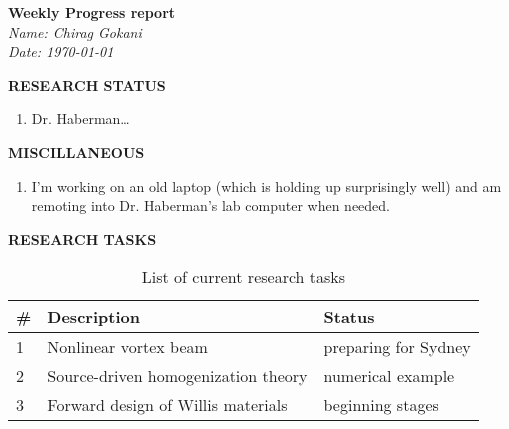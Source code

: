\documentclass[12pt]{article}
\begin{document}
\noindent\textbf{Weekly Progress report}\\
\textit{Name: Chirag Gokani\\Date: \today}\\
\vspace{12pt}


\noindent \textbf{RESEARCH STATUS}
\begin{enumerate}

\item Dr. Haberman\dots 
\end{enumerate}

\textbf{MISCILLANEOUS}
\begin{enumerate}
\item I'm working on an old laptop (which is holding up surprisingly well) and am remoting into Dr. Haberman's lab computer when needed. %
\end{enumerate}
\textbf{RESEARCH TASKS}
\begin{table}[h]
\centering
\begin{tabular}{ l | l | l } 
\textbf{\#} & \textbf{Description} &  \textbf{Status} \\
\hline\hline
1 & Nonlinear vortex beam & preparing for Sydney\\
2 & Source-driven homogenization theory& numerical example\\
3 & Forward design of Willis materials& beginning stages
\end{tabular}
\caption{List of current research tasks}\label{variables}
\end{table}
\end{document}
